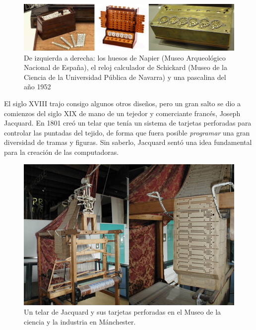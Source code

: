 \documentclass[
]{book}
\begin{document}
\begin{figure}

{\centering \includegraphics[width=1\linewidth]{images/historia/calculadoras} 

}

\caption{De izquierda a derecha: los huesos de Napier (Museo Arqueológico Nacional de España), el reloj calculador de Schickard (Museo de la Ciencia de la Universidad Pública de Navarra) y una pascalina del año 1952}\label{fig:calculadora}
\end{figure}

El siglo XVIII trajo consigo algunos otros diseños, pero un gran salto se dio a comienzos del siglo XIX de mano de un tejedor y comerciante francés, Joseph Jacquard. En 1801 creó un telar que tenía un sistema de tarjetas perforadas para controlar las puntadas del tejido, de forma que fuera posible \emph{programar} una gran diversidad de tramas y figuras. Sin saberlo, Jacquard sentó una idea fundamental para la creación de las computadoras.

\begin{figure}

{\centering \includegraphics[width=0.5\linewidth]{images/historia/telar} 

}

\caption{Un telar de Jacquard y sus tarjetas perforadas en el Museo de la ciencia y la industria en Mánchester.}\label{fig:unnamed-chunk-1}
\end{figure}
\end{document}
